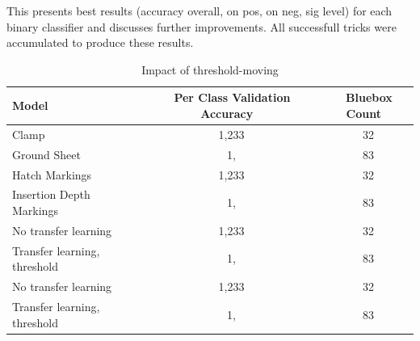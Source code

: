 \documentclass[a4paper,11pt]{article}
\begin{document}
This presents best results (accuracy overall, on pos, on neg, sig level) for each binary classifier and discusses further improvements. All successfull tricks were accumulated to produce these results. \\

\begin{table}[h!]
   \centering
    \begin{tabular}{|l|c|c|}
    \hline
    Model                            & ~ Per Class Validation Accuracy & ~ Bluebox Count  \\ 
    \hline
    Clamp                      & ~  1,233           & ~ 32      \\
    Ground Sheet     & ~ 1,               & ~ 83      \\
    Hatch Markings             & ~  1,233           & ~ 32      \\
    Insertion Depth Markings     & ~ 1,               & ~ 83      \\
    No transfer learning             & ~  1,233           & ~ 32      \\
    Transfer learning, threshold     & ~ 1,               & ~ 83      \\
    No transfer learning             & ~  1,233           & ~ 32      \\
    Transfer learning, threshold     & ~ 1,               & ~ 83      \\
    \hline
    \end{tabular}
    \caption {Impact of threshold-moving}
\end{table} 
\end{document}
